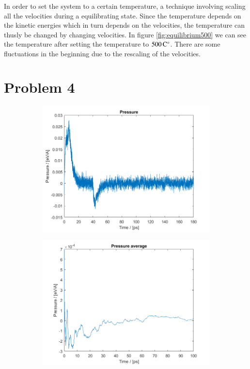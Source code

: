 
In order to set the system to a certain temperature, a technique involving scaling all the velocities during a equilibrating state. Since the temperature depends on the kinetic energies which in turn depends on the velocities, the  temperature can thusly be changed by changing velocities. In figure \ref{fig:equilibrium500} we can see the temperature after setting the temperature to $\unit[500]{C^\circ}$. There are some fluctuations in the beginning due to the rescaling of the velocities.
 

\section*{Problem 4}

\begin{figure}[H]
    \centering
    \captionsetup[subfigure]{justification=centering}
    \begin{subfigure}[b]{0.40\textwidth}
        \centering
        \includegraphics[width=\textwidth]{graphics/task4/pressure.png}
    \end{subfigure}
    \begin{subfigure}[b]{0.40\textwidth}
        \centering
        \includegraphics[width=\textwidth]{graphics/task4/pressure_avg.png}

\end{subfigure}
\end{figure}
